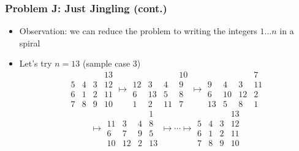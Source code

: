 \begin{frame}
  \frametitle{Problem J: Just Jingling (cont.)}

  \begin{itemize}
    \item Observation: we can reduce the problem to writing the integers $1\dots n$ in a spiral
    \item Let's try $n=13$ (sample case 3)
      \[
        \begin{array}{cccc}
            &    &   & 13\\
          5 & 4  & 3 & 12\\
          6 & 1 & 2 & 11\\
          7 & 8 & 9 & 10
        \end{array}
        \mapsto
        \begin{array}{cccc}
            &    &   & 10\\
          12 & 3  & 4 & 9\\
          6 & 13 & 5 & 8\\
          1 & 2 & 11 & 7
        \end{array}
        \mapsto
        \begin{array}{cccc}
            &    &   & 7\\
          9 & 4  & 3 & 11\\
          6 & 10 & 12 & 2\\
          13 & 5 & 8 & 1
        \end{array}
      \]
      \[
        \mapsto
        \begin{array}{cccc}
            &    &   & 1\\
          11 & 3  & 4 & 8\\
          6 & 7 & 9 & 5\\
          10 & 12 & 2 & 13
        \end{array}
        \mapsto \cdots \mapsto
        \begin{array}{cccc}
            &    &   & 13\\
          5 & 4  & 3 & 12\\
          6 & 1 & 2 & 11\\
          7 & 8 & 9 & 10
        \end{array}
      \]
  \end{itemize}
\end{frame}

